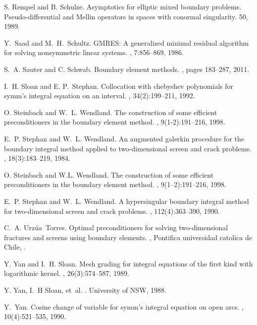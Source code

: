 \documentclass[a4paper]{article}
\begin{document}
\begin{thebibliography}{10}
 S. Rempel and B. Schulze. Asymptotics for elliptic mixed boundary problems. Pseudo-differential and Mellin operators in spaces with conormal singularity.  50, 1989.

 Y.~Saad and M.~H.~Schultz. 
\newblock GMRES: A generalized minimal residual algorithm for solving nonsymmetric linear systems.
, 7:856--869, 1986.

S.~A. Sauter and C. Schwab.
\newblock Boundary element methods.
, pages 183--287, 2011.




I.~H. Sloan and E. P.~Stephan.
\newblock Collocation with chebyshev polynomials for symm's integral equation
  on an interval.
, 34(2):199--211, 1992.

O. Steinbach and W.~L. Wendland.
\newblock The construction of some efficient preconditioners in the boundary
  element method.
, 9(1-2):191--216, 1998.

E.~P. Stephan and W.~L. Wendland.
\newblock An augmented galerkin procedure for the boundary integral method
  applied to two-dimensional screen and crack problems.
, 18(3):183--219, 1984.

{O.} Steinbach and {W.L.} Wendland.
\newblock The construction of some efficient preconditioners in the boundary
  element method.
, 9(1--2):191--216, 1998.

E.~P. Stephan and W.~L. Wendland.
\newblock A hypersingular boundary integral method for two-dimensional screen
  and crack problems.
, 112(4):363--390,
  1990.

C.~A. Urz{\'u}a~Torres.
\newblock Optimal preconditioners for solving two-dimensional fractures and
  screens using boundary elements.
,
\newblock Pontifica universidad catolica de Chile,
.

Y. Yan and I.~H. Sloan.
\newblock Mesh grading for integral equations of the first kind with
  logarithmic kernel.
, 26(3):574--587, 1989.

Y. Yan, I.~H Sloan, et~al.
.
\newblock University of NSW, 1988.

Y.~Yan.
\newblock Cosine change of variable for symm's integral equation on open arcs.
, 10(4):521--535, 1990.

\end{thebibliography}

	
	
\end{document}
